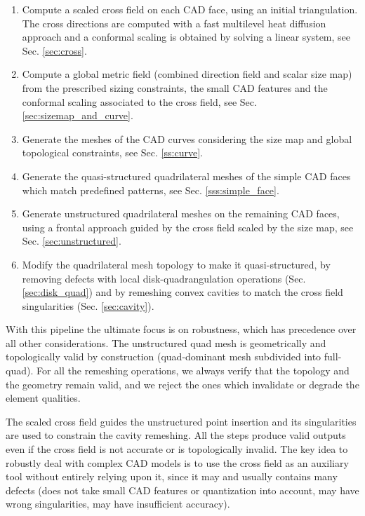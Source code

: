 \documentclass[AMA,STIX1COL]{WileyNJD-v2}
\newcommand\rsec[1]{Sec. \ref{#1}}
\begin{document}
{\begin{enumerate}
    \item Compute a scaled cross field on each CAD face, using an initial triangulation.
        The cross directions are computed with a fast multilevel heat diffusion approach
        and a conformal scaling is obtained by solving a linear system, see \rsec{sec:cross}.
    \item Compute a global metric field (combined direction field and scalar size map) from
        the prescribed sizing constraints, the small CAD features and the conformal scaling associated to
        the cross field, see \rsec{sec:sizemap_and_curve}.
    \item Generate the meshes of the CAD curves considering the size
        map and global topological constraints, see \rsec{ss:curve}.
    \item Generate the quasi-structured quadrilateral meshes of the simple CAD faces which match
        predefined patterns, see \rsec{sss:simple_face}.
    \item Generate unstructured quadrilateral meshes on the remaining CAD faces, using a frontal approach 
        guided by the cross field scaled by the size map, see \rsec{sec:unstructured}.
    \item Modify the quadrilateral mesh topology to make it quasi-structured,
        by removing defects with local disk-quadrangulation operations (\rsec{sec:disk_quad})
        and by remeshing convex cavities to match the cross field singularities (\rsec{sec:cavity}).
\end{enumerate}


With this pipeline the ultimate focus is on robustness, which has
precedence over all other considerations. The unstructured quad mesh
is geometrically and topologically valid by construction (quad-dominant mesh
subdivided into full-quad). For all the remeshing
operations, we always verify that the topology and the geometry remain
valid, and we reject the ones which invalidate or degrade the element qualities.

The scaled cross field guides the unstructured point insertion and its
singularities are used to constrain the cavity remeshing. All the steps
produce valid outputs even if the cross field is not accurate or is topologically invalid.
The key idea to robustly deal with complex CAD models is to use the
cross field as an auxiliary tool without entirely relying upon it, 
since it may and usually contains many defects 
(does not take small CAD features or quantization into account, may have wrong
singularities, may have insufficient accuracy).

}
\end{document}

